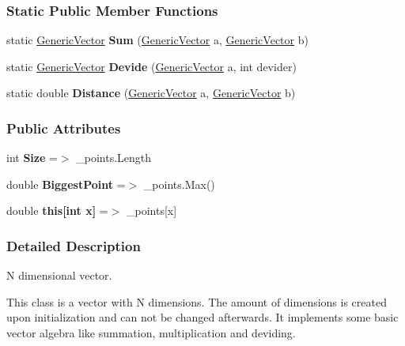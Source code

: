 \subsubsection*{Static Public Member Functions}
\begin{DoxyCompactItemize}
\item 
\mbox{\label{classDataTools_1_1GenericVector_af0e039764e63ac4045ae9946c22876b7}} 
static \hyperlink{classDataTools_1_1GenericVector}{Generic\+Vector} {\bfseries Sum} (\hyperlink{classDataTools_1_1GenericVector}{Generic\+Vector} a, \hyperlink{classDataTools_1_1GenericVector}{Generic\+Vector} b)
\item 
\mbox{\label{classDataTools_1_1GenericVector_a4d4381024a0923328a212e567f5f3a65}} 
static \hyperlink{classDataTools_1_1GenericVector}{Generic\+Vector} {\bfseries Devide} (\hyperlink{classDataTools_1_1GenericVector}{Generic\+Vector} a, int devider)
\item 
\mbox{\label{classDataTools_1_1GenericVector_ab2af09a4dcf0d49252e0a388de75b1a6}} 
static double {\bfseries Distance} (\hyperlink{classDataTools_1_1GenericVector}{Generic\+Vector} a, \hyperlink{classDataTools_1_1GenericVector}{Generic\+Vector} b)
\end{DoxyCompactItemize}
\subsubsection*{Public Attributes}
\begin{DoxyCompactItemize}
\item 
\mbox{\label{classDataTools_1_1GenericVector_af06eb7b9b70be91dadd4f12ebcaed796}} 
int {\bfseries Size} =$>$ \+\_\+points.\+Length
\item 
\mbox{\label{classDataTools_1_1GenericVector_ab9334ca30e9ffb3ef0406a11c712f05c}} 
double {\bfseries Biggest\+Point} =$>$ \+\_\+points.\+Max()
\item 
\mbox{\label{classDataTools_1_1GenericVector_a18bad8396584a2fd063e49ba30a84d55}} 
double {\bfseries this\mbox{[}int x\mbox{]}} =$>$ \+\_\+points\mbox{[}x\mbox{]}
\end{DoxyCompactItemize}


\subsubsection{Detailed Description}
N dimensional vector. 

This class is a vector with N dimensions. The amount of dimensions is created upon initialization and can not be changed afterwards. It implements some basic vector algebra like summation, multiplication and deviding. 
